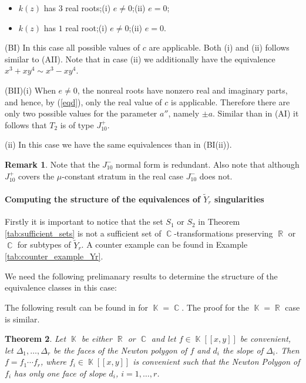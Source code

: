 \documentclass[noend]{amsproc}
\newtheorem{theorem}{Theorem}
\theoremstyle{definition}
\newtheorem{remark}[theorem]{Remark}
\DeclareMathOperator{\R}{\mathbb{R}}
\DeclareMathOperator{\C}{\mathbb{C}}
\DeclareMathOperator{\K}{\mathbb{K}}
\begin{document}
\begin{itemize}
\item[(BI)]$k(z)$ has $3$ real roots;\quad (i) $e\neq 0$;\quad (ii) $e=0$;
\item[(BII)]$k(z)$ has $1$ real root;\quad (i) $e\neq 0$;\quad (ii) $e=0$.
\end{itemize}
(BI) In this case all possible values of $c$ are applicable. Both (i) and (ii)
follows similar to (AII). Note that in case (ii) we additionally have the
equivalence $x^3+xy^4\sim x^3-xy^4$.

(BII)(i) When $e\neq 0$, the nonreal roots have nonzero real and imaginary
parts, and hence, by (\ref{eqd}), only the real value of $c$ is applicable.
Therefore there are only two possible values for the parameter $a''$, namely
$\pm a$. Similar than in (AI) it follows that $T_2$ is of type $J_{10}^+$.

(ii) In this case
we have the same equivalences than in (BI(ii)).

\begin{remark}
Note that the $J_{10}^-$ normal form is redundant. Also note that although
$J_{10}^+$ covers the $\mu$-constant stratum in the real case $J_{10}^-$ does
not.
\end{remark}
\paragraph{\bf Computing the structure of the equivalences of $\widetilde Y_r$
singularities}
Firstly it is important to notice that the set $S_1$ or $S_2$ in Theorem
\ref{tab:sufficient_sets} is not a sufficient set of $\C$-transformations
preserving $\R$ or $\C$ for subtypes of $\widetilde Y_r$. A counter example can
be found in Example \ref{tab:counter_example_Yr}.

We need the following prelimanary results to determine the structure of the
equivalence classes in this case:

The following result can be found in \citet{PdJ2000} for $\K=\C$. The proof for
the $\K=\R$ case is similar.

\begin{theorem}\label{faces}
Let $\K$ be either $\R$ or $\C$ and let $f\in\K[[x,y]]$ be convenient, let
$\Delta_1,\ldots,\Delta_r$ be the faces of the Newton polygon of $f$ and $d_i$
the slope of $\Delta_i$. Then $f=f_1\cdots f_r$, where $f_i\in\K[[x,y]]$ is
convenient such that the Newton Polygon of $f_i$ has only one face of slope
$d_i$, $i=1,\ldots,r$.
\end{theorem}
\end{document}
